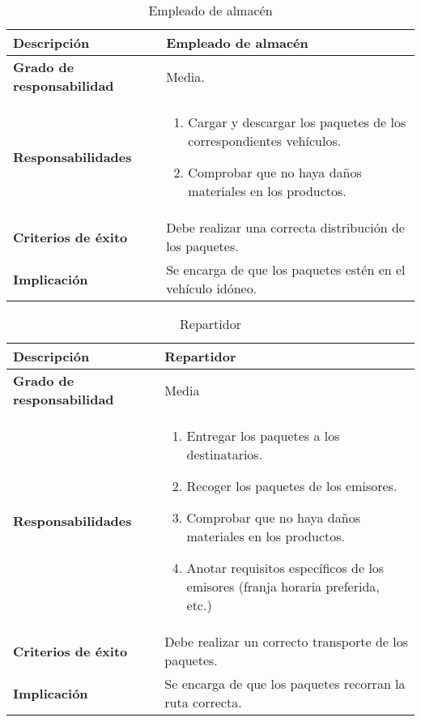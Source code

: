 \documentclass[12pt,spanish]{article}
\begin{document}

\begin{table}[H]
\begin{center}
\begin{tabular}{|l|m{9.5cm}|}
\hline
\textbf{Descripción} & Empleado de almacén \\
\hline
\textbf{Grado de responsabilidad} & Media. \\
\hline
\textbf{Responsabilidades} & 
\begin{minipage}{9.5cm}
    \vskip 1pt
    \begin{enumerate}
   		\item Cargar y descargar los paquetes de los correspondientes vehículos.
   		\item Comprobar que no haya daños materiales en los productos.
   \end{enumerate}
   \vskip 1pt
 \end{minipage}\\ 
\hline
\textbf{Criterios de éxito} & Debe realizar una correcta distribución de los paquetes.\\
\hline
\textbf{Implicación} & Se encarga de que los paquetes estén en el vehículo idóneo. \\
\hline
\end{tabular}
\caption{Empleado de almacén}
\end{center}
\end{table}

\begin{table}[H]
\begin{center}
\begin{tabular}{|l|m{9.5cm}|}
\hline
\textbf{Descripción} & Repartidor \\
\hline
\textbf{Grado de responsabilidad} & Media \\
\hline
\textbf{Responsabilidades} & 
\begin{minipage}{9.5cm}
    \vskip 1pt
    \begin{enumerate}
   		\item Entregar los paquetes a los destinatarios.
   		\item Recoger los paquetes de los emisores.
   		\item Comprobar que no haya daños materiales en los productos.
   		\item Anotar requisitos específicos de los emisores (franja horaria preferida, etc.)
   \end{enumerate}
   \vskip 1pt
 \end{minipage}\\ 
\hline
\textbf{Criterios de éxito} & Debe realizar un correcto transporte de los paquetes.\\
\hline
\textbf{Implicación} & Se encarga de que los paquetes recorran la ruta correcta. \\
\hline
\end{tabular}
\caption{Repartidor}
\end{center}
\end{table}
\end{document}
